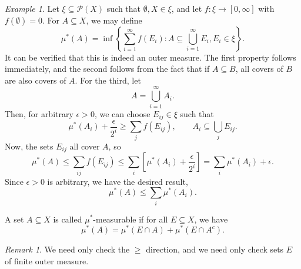 \documentclass[11pt]{article}
\theoremstyle{definition}
\theoremstyle{remark}
\newtheorem*{remark}{Remark}
\newtheorem*{example}{Example}
\numberwithin{equation}{section}
\begin{document}
    \begin{example}
        Let $\xi \subseteq \mathcal{P}(X)$ such that $\emptyset, X \in \xi$, and let
        $f\colon \xi \to [0, \infty]$ with $f(\emptyset) = 0$. For $A \subseteq X$,
        we may define \[
            \mu^*(A) = \inf\left\{\sum_{i = 1}^\infty f(E_i) : A \subseteq \bigcup_{i
            = 1}^\infty E_i, E_i \in \xi\right\}.
        \] It can be verified that this is indeed an outer measure. The first
        property follows immediately, and the second follows from the fact that if
        $A\subseteq B$, all covers of $B$ are also covers of $A$. For the third, let
        \[
            A = \bigcup_{i = 1}^\infty A_i.
        \] Then, for arbitrary $\epsilon > 0$, we can choose $E_{ij} \in \xi$ such
        that \[
            \mu^*(A_i) + \frac{\epsilon}{2^i} \geq \sum_j f(E_{ij}), \qquad 
            A_i \subseteq \bigcup_j E_{ij}.
        \] Now, the sets $E_{ij}$ all cover $A$, so \[
            \mu^*(A) \leq \sum_{ij} f(E_{ij}) \leq \sum_i \left[\mu^*(A_i) +
            \frac{\epsilon}{2^i}\right] = \sum_i \mu^*(A_i) + \epsilon.
        \] Since $\epsilon > 0$ is arbitrary, we have the desired result, \[
            \mu^*(A) \leq \sum_i \mu^*(A_i).
        \] 
    \end{example}

    \begin{definition}
        A set $A \subseteq X$ is called $\mu^*$-measurable if for all $E \subseteq
        X$, we have \[
            \mu^*(A) = \mu^*(E \cap A) + \mu^*(E \cap A^c).
        \]
        \begin{remark}
            We need only check the $\geq$ direction, and we need only check sets $E$
            of finite outer measure.
        \end{remark}
    \end{definition}
\end{document}
